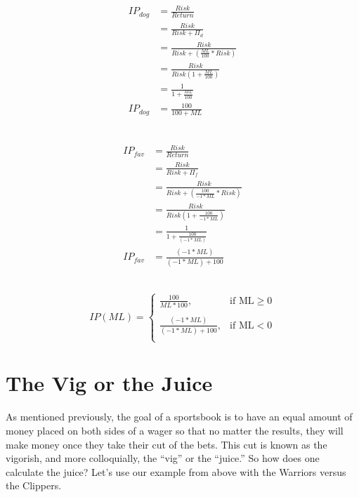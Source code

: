 \documentclass [MS] {uclathes}
\begin{document}
\noindent {} \\
\begin{equation} \label{ip_dog}
\begin{split}
IP_{dog} & = \frac{Risk}{Return}  \\
& = \frac{Risk}{Risk + \Pi_{d}}  \\
& = \frac{Risk}{Risk + \left( \frac{ML}{100}*Risk \right)} \\ 
& = \frac{Risk}{Risk \left( 1 + \frac{ML}{100}  \right)} \\ 
& = \frac{1}{ 1 + \frac{ML}{100} } \\ 
IP_{dog} & = \frac{100}{100 + ML} 
\end{split}
\end{equation}


\noindent {} \\
\begin{equation} \label{ip_dog}
\begin{split}
IP_{fav} & = \frac{Risk}{Return}  \\
& = \frac{Risk}{Risk + \Pi_{f}}  \\
& = \frac{Risk}{Risk + \left( \frac{100}{-1 * ML} * Risk \right) } \\ 
& = \frac{Risk}{Risk \left( 1 + \frac{100}{-1 * ML}  \right)} \\ 
& = \frac{1}{ 1 + \frac{100}{(-1 * ML)} } \\ 
IP_{fav} & = \frac{(-1 * ML)}{(-1 * ML) + 100} 
\end{split}
\end{equation}

\noindent {} \\
\[
IP(ML) =
\begin{cases}
\displaystyle
 \frac{100}
 {ML * 100},  & \text{if ML} \geq 0 \\ \\ 
\displaystyle
 \frac{(-1 * ML)}
 {(-1 * ML) +100}, &  \text{if ML} <  0\\ 
\end{cases}
\]

\section{The Vig or the Juice}
As mentioned previously, the goal of a sportsbook is to have an equal amount of money placed on both sides of a wager so that no matter the results, they will make money once they take their cut of the bets. This cut is known as the vigorish, and more colloquially, the ``vig'' or the ``juice.'' So how does one calculate the juice? Let's use our example from above with the Warriors versus the Clippers. \\
\end{document}
